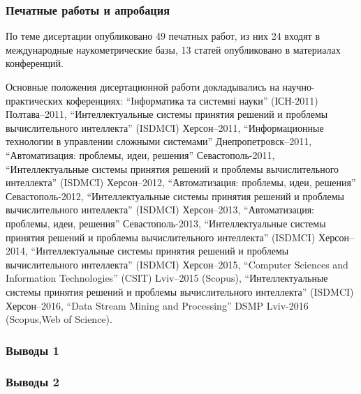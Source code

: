 \documentclass[10pt,utf8]{beamer}
\begin{document}

\begin{frame}
  \frametitle{Печатные работы и апробация}

{\scriptsize
По теме дисертации опубликовано
49 печатных работ,
из них
24 входят в международные наукометрические базы,
13 статей опубликовано в материалах конференций.

Основные положения дисертационной работи докладывались на
научно-практических коференциях:
``Інформатика та системні науки'' (ІСН-2011) Полтава--2011,
``Интеллектуальные системы принятия решений и проблемы вычислительного интеллекта'' (ISDMCI) Херсон--2011,
``Информационные технологии в управлении сложными системами'' Днепропетровск--2011,
``Автоматизация: проблемы, идеи, решения'' Севастополь-2011,
``Интеллектуальные системы принятия решений и проблемы вычислительного интеллекта'' (ISDMCI) Херсон--2012,
``Автоматизация: проблемы, идеи, решения'' Севастополь-2012,
``Интеллектуальные системы принятия решений и проблемы вычислительного интеллекта'' (ISDMCI) Херсон--2013,
``Автоматизация: проблемы, идеи, решения'' Севастополь-2013,
``Интеллектуальные системы принятия решений и проблемы вычислительного интеллекта'' (ISDMCI) Херсон--2014,
``Интеллектуальные системы принятия решений и проблемы вычислительного интеллекта'' (ISDMCI) Херсон--2015,
``Computer Sciences and Information Technologies'' (CSIT) Lviv--2015 (Scopus),
``Интеллектуальные системы принятия решений и проблемы вычислительного интеллекта'' (ISDMCI) Херсон--2016,
``Data Stream Mining and Processing'' DSMP Lviv-2016 (Scopus,Web of Science).
}

\end{frame}





\begin{frame}
  \frametitle{Выводы 1}


\end{frame}




\begin{frame}
  \frametitle{Выводы 2}


\end{frame}
\end{document}
